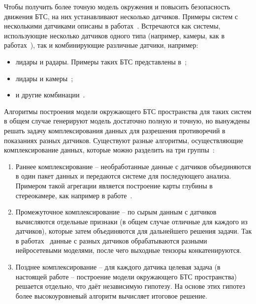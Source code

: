 Чтобы получить более точную модель окружения и повысить безопасность движения БТС, на них устанавливают несколько датчиков. Примеры систем с несколькими датчиками описаны в работах~\autocite{xu2020data, rosenband2017inside}. Встречаются как системы, использующие несколько датчиков одного типа (например, камеры, как в работах~\autocite{bertozzi1998experience, bochare2025cameraonlybirdseyeview}), так и комбинирующие различные датчики, например: 
\begin{itemize}
	\item лидары и радары. Примеры таких БТС представлены в~\autocite{gohring2011radar, wang2023bi, song2024lirafusion};
	\item лидары и камеры~\autocite{tibebu2021lidar, caltagirone2019lidar, liu2023real};
	\item и другие комбинации~\autocite{yao2023radar, nabati2021centerfusion, s23063335}. 
\end{itemize}

Алгоритмы построения модели окружающего БТС пространства для таких систем в общем случае генерируют модель достаточно полную и точную, но вынуждены решать задачу комплексирования данных для разрешения противоречий в показаниях разных датчиков. Существуют разные алгоритмы, осуществляющие комплексирование данных, которые можно разделить на три группы~\cite{s21062140}:

\begin{enumerate}
	\item Раннее комплексирование -- необработанные данные с датчиков объединяются в один пакет данных и передаются системе для последующего анализа. Примером такой агрегации является построение карты глубины в стереокамере, как например в работе~\cite{smagina2018obstacle}.
	
	\item Промежуточное комплексирование -- по сырым данным с датчиков вычисляются отдельные признаки (в общем случае отличные для каждого из датчиков), которые затем объединяются для дальнейшего решения задачи. Так в работах~\cite{fan2022deep, jiang2021manipulator} данные с разных датчиков обрабатываются разными нейросетевыми моделями, после чего выходные тензоры конкатенируются.
	
	\item Позднее комплексирование -- для каждого датчика целевая задача (в настоящей работе -- построение модели окружающего БТС пространства) решается отдельно, что даёт независимую гипотезу. На основе этих гипотез более высокоуровневый алгоритм вычисляет итоговое решение.
\end{enumerate}


